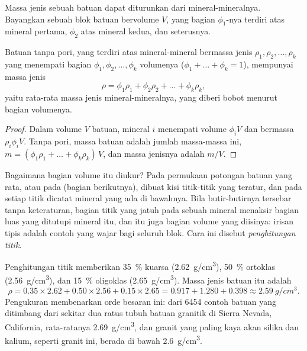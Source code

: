 Massa jenis sebuah batuan dapat diturunkan dari mineral-mineralnya. Bayangkan
sebuah blok batuan bervolume $V$, yang bagian $\phi_1$-nya terdiri atas mineral
pertama, $\phi_2$ atas mineral kedua, dan seterusnya.

\begin{proposition}\label{prop:g11:minerals:density}
Batuan tanpa pori, yang terdiri atas mineral-mineral bermassa jenis $\rho_1, \rho_2, \dots,
\rho_k$ yang menempati bagian $\phi_1, \phi_2, \dots, \phi_k$ volumenya
($\phi_1 + \dots + \phi_k = 1$), mempunyai massa jenis
\[
  \rho = \phi_1 \rho_1 + \phi_2 \rho_2 + \dots + \phi_k \rho_k ,
\]
yaitu rata-rata massa jenis mineral-mineralnya, yang diberi bobot menurut bagian
volumenya.
\end{proposition}

\begin{proof}
Dalam volume $V$ batuan, mineral $i$ menempati volume $\phi_i V$ dan bermassa
$\rho_i \phi_i V$. Tanpa pori, massa batuan adalah jumlah massa-massa ini,
$m = (\phi_1 \rho_1 + \dots + \phi_k \rho_k)\,V$, dan massa jenisnya adalah
$m/V$.
\end{proof}

Bagaimana bagian volume itu diukur? Pada permukaan potongan batuan yang rata,
atau pada  (bagian berikutnya), dibuat kisi titik-titik yang
teratur, dan pada setiap titik dicatat mineral yang ada di bawahnya. Bila
butir-butirnya tersebar tanpa keteraturan, bagian titik yang jatuh pada sebuah
mineral menaksir bagian luas yang ditutupi mineral itu, dan itu juga bagian
volume yang diisinya: irisan tipis adalah contoh yang wajar bagi seluruh blok.
Cara ini disebut \emph{penghitungan titik}.

\begin{example}
Penghitungan titik memberikan \qty{35}{\percent} kuarsa (\qty{2.62}{g/cm^3}),
\qty{50}{\percent} ortoklas (\qty{2.56}{g/cm^3}), dan \qty{15}{\percent}
oligoklas (\qty{2.65}{g/cm^3}). Massa jenis batuan itu adalah
\[
  \rho = 0.35 \times 2.62 + 0.50 \times 2.56 + 0.15 \times 2.65
       = 0.917 + 1.280 + 0.398 \approx \qty{2.59}{g/cm^3}.
\]
Pengukuran membenarkan orde besaran ini: dari \num{6454} contoh batuan yang
ditimbang dari sekitar dua ratus tubuh batuan granitik di Sierra Nevada,
California, rata-ratanya \qty{2.69}{g/cm^3}, dan granit yang paling kaya akan
silika dan kalium, seperti granit ini, berada di bawah \qty{2.6}{g/cm^3}.
\end{example}

